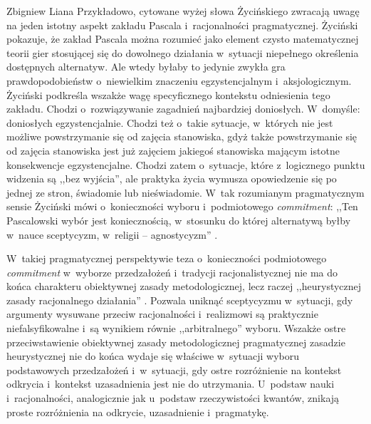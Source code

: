 \begin{artplenv}{Zbigniew Liana}
Przykładowo, cytowane wyżej słowa Życińskiego zwracają uwagę na jeden istotny aspekt zakładu Pascala i~racjonalności pragmatycznej. Życiński pokazuje, że zakład Pascala można rozumieć jako element czysto matematycznej teorii gier stosującej się do dowolnego działania w~sytuacji niepełnego określenia dostępnych alternatyw. Ale wtedy byłaby to jedynie zwykła gra prawdopodobieństw o~niewielkim znaczeniu egzystencjalnym i~aksjologicznym. Życiński podkreśla wszakże wagę specyficznego kontekstu odniesienia tego zakładu. Chodzi o~rozwiązywanie zagadnień najbardziej doniosłych. W~domyśle: doniosłych egzystencjalnie. Chodzi też o~takie sytuacje, w~których nie jest możliwe powstrzymanie się od zajęcia stanowiska, gdyż także powstrzymanie się od zajęcia stanowiska jest już zajęciem jakiegoś stanowiska mającym istotne konsekwencje egzystencjalne. Chodzi zatem o~sytuacje, które z~logicznego punktu widzenia są ,,bez wyjścia'', ale praktyka życia wymusza opowiedzenie się po jednej ze stron, świadomie lub nieświadomie. W~tak rozumianym pragmatycznym sensie Życiński mówi o~konieczności wyboru i~podmiotowego \textit{commitment}: ,,Ten Pascalowski wybór jest koniecznością, w~stosunku do której alternatywą byłby w~nauce sceptycyzm, w~religii -- agnostycyzm''
\parencite[][s.~230]{zycinski_teizm_1985}.%


W~takiej pragmatycznej perspektywie teza o~konieczności podmiotowego \textit{commitment} w~wyborze przedzałożeń i~tradycji racjonalistycznej nie ma do końca charakteru obiektywnej zasady metodologicznej, lecz raczej ,,heurystycznej zasady racjonalnego działania''
\parencite[][s.~211]{zycinski_teizm_1985}. %
 Pozwala uniknąć sceptycyzmu w~sytuacji, gdy argumenty wysuwane przeciw racjonalności i~realizmowi są praktycznie niefalsyfikowalne i~są wynikiem równie ,,arbitralnego'' wyboru. Wszakże ostre przeciwstawienie obiektywnej zasady metodologicznej pragmatycznej zasadzie heurystycznej nie do końca wydaje się właściwe w~sytuacji wyboru podstawowych przedzałożeń i~w~sytuacji, gdy ostre rozróżnienie na kontekst odkrycia i~kontekst uzasadnienia jest nie do utrzymania. U~podstaw nauki i~racjonalności, analogicznie jak u~podstaw rzeczywistości kwantów, znikają proste rozróżnienia na odkrycie, uzasadnienie i~pragmatykę.


\end{artplenv}
